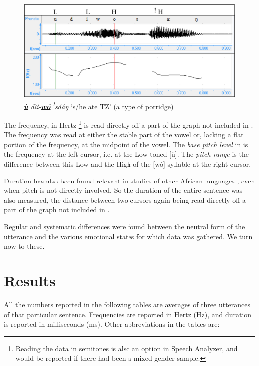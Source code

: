 \documentclass[output=paper]{langsci/langscibook}
\begin{document}
\begin{figure}[h]
\includegraphics[width=\textwidth]{figures/cahillfig1}
\caption{\textit{\textbf{\underline{ù}} dìì-\textbf{\underline{wó}} \textit{\textsuperscript{!}}sááŋ}  `s/he ate TZ' (a type of porridge)}
\label{fig:1.cahill}
\end{figure}



The frequency, in Hertz \footnote{Reading the data in semitones is also an option in Speech Analyzer, and would be reported if there had been a mixed gender sample.} is read directly off a part of the graph not included in . The frequency was read at either the stable part of the vowel or, lacking a flat portion of the frequency, at the midpoint of the vowel.  The \emph{base pitch level} in  is the frequency at the left cursor, i.e. at the Low toned [ù]. The \emph{pitch range} is the difference between this Low and the High of the [wó] syllable at the right cursor. 

Duration has also been found relevant in studies of other African languages \citep{hymanmonaka2011,fiedlerjannedy2013}, even when pitch is not directly involved. So the duration of the entire sentence was also measured, the distance between two cursors again being read directly off a part of the graph not included in .

Regular and systematic differences were found between the neutral form of the utterance and the various emotional states for which data was gathered. We turn now to these. 

\section{Results} 
All the numbers reported in the following tables are averages of three utterances of that particular sentence. Frequencies are reported in Hertz (Hz), and duration is reported in milliseconds (ms). Other abbreviations in the tables are: 
\end{document}
